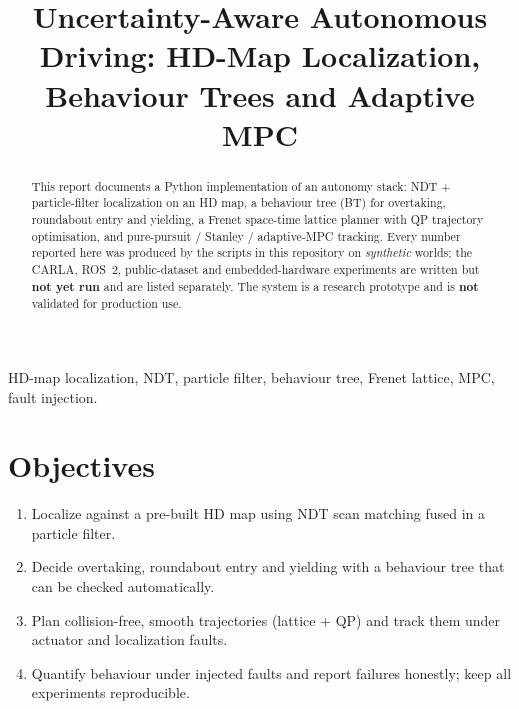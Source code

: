 \documentclass[conference]{IEEEtran}
\begin{document}
\title{Uncertainty-Aware Autonomous Driving: HD-Map Localization, Behaviour Trees and Adaptive MPC}
\author{}
\maketitle

\begin{abstract}
This report documents a Python implementation of an autonomy stack: NDT + particle-filter localization on an HD map, a behaviour tree (BT) for overtaking, roundabout entry and yielding, a Frenet space-time lattice planner with QP trajectory optimisation, and pure-pursuit / Stanley / adaptive-MPC tracking. Every number reported here was produced by the scripts in this repository on \emph{synthetic} worlds; the CARLA, ROS~2, public-dataset and embedded-hardware experiments are written but \textbf{not yet run} and are listed separately. The system is a research prototype and is \textbf{not} validated for production use.
\end{abstract}
\begin{IEEEkeywords}
HD-map localization, NDT, particle filter, behaviour tree, Frenet lattice, MPC, fault injection.
\end{IEEEkeywords}

\section{Objectives}
\begin{enumerate}
\item Localize against a pre-built HD map using NDT scan matching fused in a particle filter.
\item Decide overtaking, roundabout entry and yielding with a behaviour tree that can be checked automatically.
\item Plan collision-free, smooth trajectories (lattice + QP) and track them under actuator and localization faults.
\item Quantify behaviour under injected faults and report failures honestly; keep all experiments reproducible.
\end{enumerate}
\end{document}
